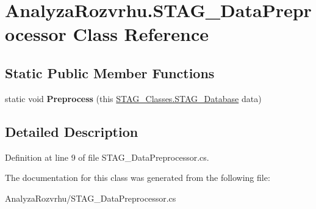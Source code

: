 \hypertarget{class_analyza_rozvrhu_1_1_s_t_a_g___data_preprocessor}{}\section{Analyza\+Rozvrhu.\+S\+T\+A\+G\+\_\+\+Data\+Preprocessor Class Reference}
\label{class_analyza_rozvrhu_1_1_s_t_a_g___data_preprocessor}
\subsection*{Static Public Member Functions}
\begin{DoxyCompactItemize}
\item 
\mbox{\label{class_analyza_rozvrhu_1_1_s_t_a_g___data_preprocessor_ab2269dd867680c3175e90fb8f1e55300}} 
static void {\bfseries Preprocess} (this \hyperlink{class_analyza_rozvrhu_1_1_s_t_a_g___classes_1_1_s_t_a_g___database}{S\+T\+A\+G\+\_\+\+Classes.\+S\+T\+A\+G\+\_\+\+Database} data)
\end{DoxyCompactItemize}


\subsection{Detailed Description}


Definition at line 9 of file S\+T\+A\+G\+\_\+\+Data\+Preprocessor.\+cs.



The documentation for this class was generated from the following file\+:\begin{DoxyCompactItemize}
\item 
Analyza\+Rozvrhu/S\+T\+A\+G\+\_\+\+Data\+Preprocessor.\+cs\end{DoxyCompactItemize}
